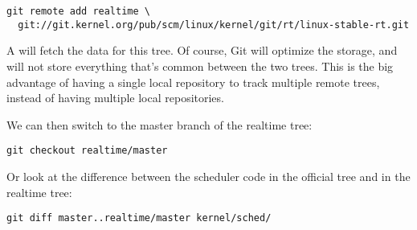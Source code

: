 \small
\begin{verbatim}
git remote add realtime \
  git://git.kernel.org/pub/scm/linux/kernel/git/rt/linux-stable-rt.git
\end{verbatim}
\normalsize

A  will fetch the data for this tree. Of course, Git
will optimize the storage, and will not store everything that's common
between the two trees. This is the big advantage of having a single
local repository to track multiple remote trees, instead of having
multiple local repositories.

We can then switch to the master branch of the realtime tree:

\begin{verbatim}
git checkout realtime/master
\end{verbatim}

Or look at the difference between the scheduler code in the official
tree and in the realtime tree:

\begin{verbatim}
git diff master..realtime/master kernel/sched/
\end{verbatim}

